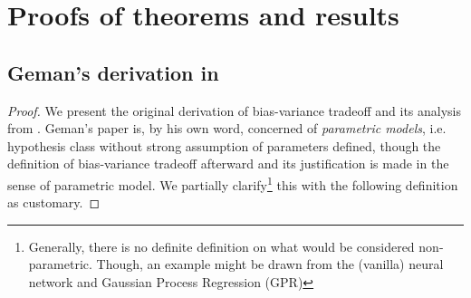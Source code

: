 \documentclass{article}
\begin{document}
  
  

\clearpage

\appendix

\section{Proofs of theorems and results}

\subsection{Geman's derivation in \cite{6797087}}

\begin{proof}
    We present the original derivation of bias-variance tradeoff and its analysis from \cite{6797087}. Geman's paper is, by his own word, concerned of \textit{parametric models}, i.e. hypothesis class without strong assumption of parameters defined, though the definition of bias-variance tradeoff afterward and its justification is made in the sense of parametric model. We partially clarify\footnote{Generally, there is no definite definition on what would be considered non-parametric. Though, an example might be drawn from the (vanilla) neural network and Gaussian Process Regression (GPR)} this with the following definition as customary. 


\end{proof}
\end{document}
